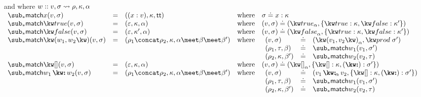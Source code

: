 \flushleft
{}
and
where $w :: v, \sigma \rightsquigarrow \rho, \kappa, \alpha$ \\
\small
\vspace{3mm}
$\begin{array}{lllll}
   \matchFwdF{x}(v, \sigma)
   &=&
   (\bind{x}{v}, \kappa, \TT)
   &\text{where}&
   \sigma \eq \elimVar{x}{\kappa}
   \\
   \matchFwdF{\matchTrueNew}(v, \sigma)
   &=&
   (\seqEmpty, \kappa, \alpha)
   &\text{where}&
   (v, \sigma) \eq (\annTrue{\alpha}, \elimBool{\kappa}{\kappa'})
   \\
   \matchFwdF{\matchFalseNew}(v, \sigma)
   &=&
   (\seqEmpty, \kappa', \alpha)
   &\text{where}&
   (v, \sigma) \eq (\annFalse{\alpha}, \elimBool{\kappa}{\kappa'})
   \\
   \matchFwdF{\matchPair{w_1}{w_2}}(v, \sigma)
   &=&
   (\rho_1 \concat \rho_2, \kappa, \alpha \meet \beta \meet \beta')
   &\text{where}&
   \begin{array}[t]{lll}
      (v, \sigma) &\eq& (\annPair{v_1}{v_2}{\alpha}, \elimProd{\sigma'})
      \\
      (\rho_1, \tau, \beta) &\eq& \matchFwdF{w_1}(v_1,\sigma')
      \\
      (\rho_2, \kappa, \beta') &\eq& \matchFwdF{w_2}(v_2,\tau)
   \end{array}
   \\
   \matchFwdF{\matchNilNew}(v, \sigma)
   &=&
   (\seqEmpty, \kappa, \alpha)
   &\text{where}&
   (v, \sigma) \eq (\annNil{\alpha}, \elimList{\kappa}{\sigma'})
   \\
   \matchFwdF{\matchConsNew{w_1}{w_2}}(v, \sigma)
   &=&
   (\rho_1 \concat \rho_2, \kappa, \alpha \meet \beta \meet \beta')
   &\text{where}&
   \begin{array}[t]{lll}
      (v, \sigma) &\eq& (\annCons{v_1}{v_2}{\alpha}, \elimList{\kappa}{\sigma'})
      \\
      (\rho_1, \tau, \beta) &\eq& \matchFwdF{w_1}(v_1,\sigma')
      \\
      (\rho_2, \kappa, \beta') &\eq& \matchFwdF{w_2}(v_2,\tau)
   \end{array}
\end{array}$\\
